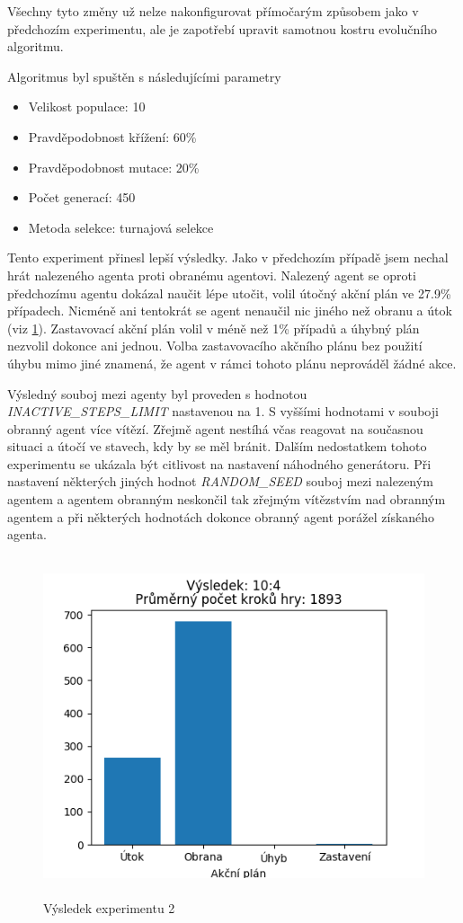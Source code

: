 \par
Všechny tyto změny už nelze nakonfigurovat přímočarým způsobem jako v předchozím experimentu, ale je zapotřebí upravit samotnou kostru evolučního algoritmu.
\par
Algoritmus byl spuštěn s následujícími parametry
\begin{itemize}
    \item Velikost populace: 10
    \item Pravděpodobnost křížení: 60\%
    \item Pravděpodobnost mutace: 20\%
    \item Počet generací: 450
    \item Metoda selekce: turnajová selekce
\end{itemize}

Tento experiment přinesl lepší výsledky. Jako v předchozím případě jsem nechal hrát nalezeného agenta proti obranému agentovi.
Nalezený agent se oproti předchozímu agentu dokázal naučit lépe utočit, volil útočný akční plán ve 27.9\% případech. 
Nicméně ani tentokrát se agent nenaučil nic jiného než obranu a útok (viz \ref{obr04:Výsledek experimentu 02}). 
Zastavovací akční plán volil v méně než 1\% případů a úhybný plán nezvolil dokonce ani jednou. Volba zastavovacího akčního plánu bez použití úhybu mimo jiné znamená, že agent v rámci tohoto plánu neprováděl žádné akce.
\par
Výsledný souboj mezi agenty byl proveden s hodnotou \emph{\uppercase{inactive\_steps\_limit}} nastavenou na 1.
S vyššími hodnotami v souboji obranný agent více vítězí. Zřejmě agent nestíhá včas reagovat na současnou situaci a útočí ve stavech, kdy by se měl bránit.
Dalším nedostatkem tohoto experimentu se ukázala být citlivost na nastavení náhodného generátoru. Při nastavení některých jiných hodnot \emph{\uppercase{random\_seed}} souboj mezi nalezeným agentem a agentem obranným neskončil tak zřejmým vítězstvím nad obranným agentem a při některých hodnotách dokonce obranný agent porážel získaného agenta.

 


\begin{figure}[p]\centering
\includegraphics[width=125mm, height=100mm]{./Obrazky/Experiment02Results.png}
\caption{Výsledek experimentu 2}
\label{obr04:Výsledek experimentu 02}
\end{figure}

